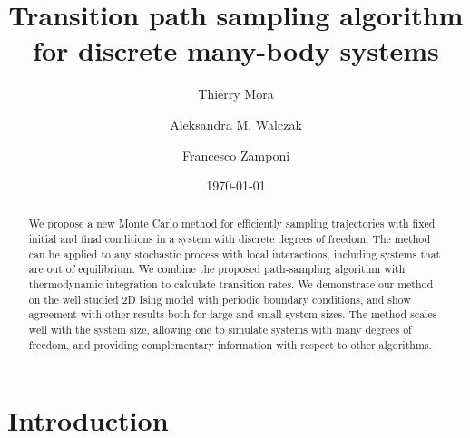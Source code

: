 \documentclass[aps,twocolumn,floats,pre,amsmath,superscriptaddress]{revtex4}
\newcommand{\<}{\langle}
\renewcommand{\>}{\rangle}
\begin{document}
\title{Transition path sampling algorithm for discrete many-body systems}


\author{Thierry Mora}

\author{Aleksandra M. Walczak}

\author{Francesco Zamponi}


\date{\today}

\begin{abstract}
We propose a new Monte Carlo method for efficiently sampling trajectories with fixed initial and final conditions in a system with discrete degrees of freedom.
The method can be applied to any stochastic process with local interactions, including systems that are out of equilibrium. We combine the proposed path-sampling algorithm with thermodynamic integration to calculate transition rates. We demonstrate our method on the well studied 2D Ising model with periodic boundary conditions, and show agreement with other results both for large and small system sizes. 
The method scales well with the system size, allowing one to simulate systems with many degrees of freedom, and providing complementary information with 
respect to other algorithms.
\end{abstract}

\maketitle


\section{Introduction}
\end{document}
